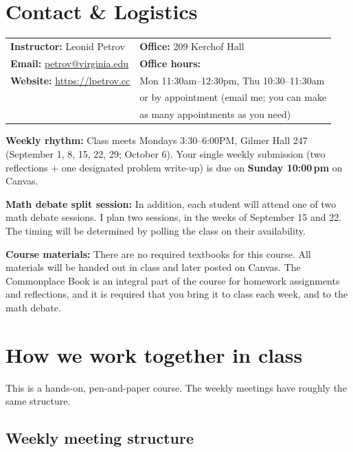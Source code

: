\documentclass[oneside,11pt]{amsart}
\begin{document}
\newpage
\section{Contact \& Logistics}

\noindent
\begin{tabular}{ll}
\textbf{Instructor:} Leonid Petrov &\qquad \qquad \qquad\textbf{Office:} 209 Kerchof Hall \\
\textbf{Email:} \href{mailto:petrov@virginia.edu}{petrov@virginia.edu} & \qquad \qquad \qquad\textbf{Office hours:} \\
\textbf{Website:} \url{https://lpetrov.cc}
& \qquad \qquad \qquad Mon 11:30am--12:30pm, Thu 10:30--11:30am \\
& \qquad \qquad \qquad or by appointment (email me; you can make \\
& \qquad \qquad \qquad as many appointments as you need)
\end{tabular}

\smallskip
\noindent\textbf{Weekly rhythm:} Class meets Mondays
3:30--6:00PM, Gilmer Hall 247
(September 1, 8, 15, 22, 29; October 6).
Your single weekly submission (two reflections + one designated problem write-up) is due on \textbf{Sunday 10:00\,pm} on Canvas.

\smallskip
\noindent
\textbf{Math debate split session:}
In addition, each student will attend one of two math debate sessions. I plan two
sessions, in the weeks of September 15 and 22. The timing will be
determined by polling the class on their availability.

\smallskip
\noindent
\textbf{Course materials:}
There are no required textbooks for this course.
All materials will be handed out in class and later posted on Canvas.
The Commonplace Book is an integral part of the course for homework assignments and reflections,
and it is required that you bring it to class each week, and to the math debate.

\section{How we work together in class}

This is a hands-on, pen-and-paper course.
The weekly meetings have roughly the same structure.

\subsection{Weekly meeting structure}
\end{document}
